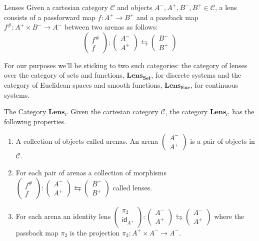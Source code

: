 \documentclass[12pt]{article}
\begin{document}
\begin{definition}{Lenses}{}
    Given a cartesian category $\mathcal{C}$ and objects $A^-, A^+, B^-, B^+ \in\mathcal{C}$, a lens consists of a passforward map $f:A^+\rightarrow B^+$ and a passback map $f^\#:A^+ \times B^- \rightarrow A^-$ between two arenas as follows:
    \[
        \begin{pmatrix}f^{\#}\\f\end{pmatrix}:\begin{pmatrix}A^-\\A^+\end{pmatrix}\leftrightarrows\begin{pmatrix}B^-\\B^+\end{pmatrix}
    \]
\end{definition}

For our purposes we'll be sticking to two such categories: the category of lenses over the category of sets and functions, $\textbf{Lens}_{\textbf{Set}}$, for discrete systems and the category of Euclidean spaces and smooth functions, $\textbf{Lens}_\textbf{Euc}$, for continuous systems.

\begin{definition}{The Category $\textbf{Lens}_\mathcal{C}$}{}
    Given the cartesian category $\mathcal{C}$, the category $\textbf{Lens}_{\mathcal{C}}$ has the following properties.
    \begin{enumerate}
        \item A collection of objects called arenas. An arena $\begin{pmatrix}A^-\\A^+\end{pmatrix}$ is a pair of objects in $\mathcal{C}$.
        \item For each pair of arenas a collection of morphisms $\begin{pmatrix}f^{\#}\\f\end{pmatrix}:\begin{pmatrix}A^-\\A^+\end{pmatrix}\leftrightarrows\begin{pmatrix}B^-\\B^+\end{pmatrix}$ called lenses.
        \item For each arena an identity lens $\begin{pmatrix}\pi_2\\\mathsf{id}_{A^+}\end{pmatrix}:\begin{pmatrix}A^-\\A^+\end{pmatrix}\leftrightarrows\begin{pmatrix}A^-\\A^+\end{pmatrix}$ where the passback map $\pi_2$ is the projection $\pi_2:A^+ \times A^- \rightarrow A^-$.
    \end{enumerate}
\end{definition}
\end{document}
